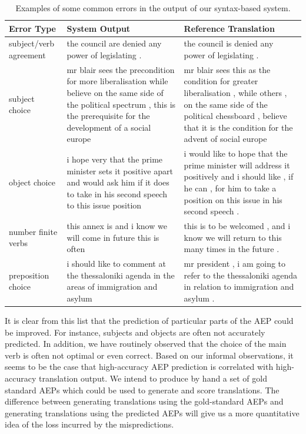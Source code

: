 \documentclass[11pt]{report}
\theoremstyle{plain}
\begin{document}
{\begin{table}
\caption{Examples of some common errors in the output of our syntax-based system.}
\begin{center}
\begin{tabular}{p{.8in}|p{1.85in}p{1.85in}}
{\bf Error Type} & {\bf System Output} & {\bf Reference Translation}\\
\hline subject/verb agreement & the council are denied any power of legislating . & the council is denied any power of legislating .\\
\hline subject choice & mr blair sees the precondition for more liberalisation while believe on the same side of the political spectrum , this is the prerequisite for the development of a social europe & mr blair sees this as the condition for greater liberalisation , while others , on the same side of the political chessboard , believe that it is the condition for the advent of social europe \\
\hline object choice & i hope very that the prime minister sets it positive apart and would ask him if it does to take in his second speech to this issue position & i would like to hope that the prime minister will address it positively and i should like , if he can , for him to take a position on this issue in his second speech . \\
\hline number finite verbs & this annex is and i know we will come in future this is often & this is to be welcomed , and i know we will return to this many times in the future .\\
\hline preposition choice & i should like to comment at the thessaloniki agenda in the areas of immigration and asylum& mr president , i am going to refer to the thessaloniki agenda in relation to immigration and asylum .\\
\hline
\end{tabular}
\end{center}
\label{errors}
\end{table}

It is clear from this list that the prediction of particular parts of
the AEP could be improved. For instance, subjects and objects are
often not accurately predicted. In addition, we have routinely
observed that the choice of the main verb is often not optimal or even
correct. Based on our informal observations, it seems to be the case
that high-accuracy AEP prediction is correlated with high-accuracy
translation output. We intend to produce by hand a set of gold
standard AEPs which could be used to generate and score
translations. The difference between generating translations using the
gold-standard AEPs and generating translations using the predicted
AEPs will give us a more quantitative idea of the loss incurred by the
mispredictions.

}
\end{document}
